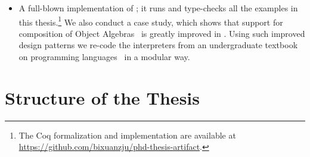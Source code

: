 \begin{itemize}
\item A full-blown implementation of \sedel; it runs and type-checks all the
  examples in this thesis.\footnote{The Coq formalization and implementation are
    available at \url{https://github.com/bixuanzju/phd-thesis-artifact}.} We
  also conduct a case study, which shows that support for composition of Object
  Algebras~\citep{oliveira2012extensibility} is greatly improved in \sedel.
  Using such improved design patterns we re-code the interpreters from an
  undergraduate textbook on programming languages~\citep{poplcook} in a modular
  way.

\end{itemize}




\section{Structure of the Thesis}

